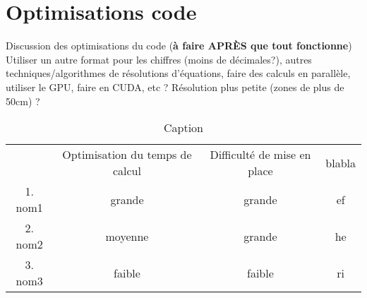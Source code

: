 \chapter{Optimisations code}
\label{chaper-5}

Discussion des optimisations du code (\textbf{à faire APRÈS que tout fonctionne})\\

Utiliser un autre format pour les chiffres (moins de décimales?), autres techniques/algorithmes de résolutions d'équations, faire des calculs en parallèle, utiliser le GPU, faire en CUDA, etc ? Résolution plus petite (zones de plus de 50cm) ?\\

\begin{table}[h]
    \centering
    \begin{tabular}{c|c|c|c|}
         & Optimisation du temps de calcul & Difficulté de mise en place & blabla\\
         1. nom1 & grande & grande & ef\\
         2. nom2 & moyenne & grande & he\\
         3. nom3 & faible & faible & ri\\
    \end{tabular}
    \caption{Caption}
    \label{tab:optimisation-table}
\end{table}